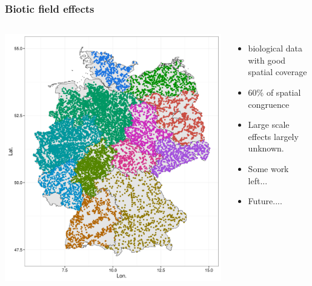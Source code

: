 \documentclass[
	12pt
	]{beamer}
\begin{document}
\begin{frame}
\frametitle{Biotic field effects}
	\begin{columns}
	    	    	\includegraphics[width=1.1\textwidth, keepaspectratio]{figs/mzb_map.png}
	    \begingroup
		\footnotesize %
	        \begin{itemize}
	        	\item biological data with good spatial coverage
	        	\item 60\% of spatial congruence 
	        	\item Large scale effects largely unknown.
	        	\item Some work left...
	        	\item Future....
	        \end{itemize}
	       \endgroup
	\end{columns}

\end{frame}
\end{document}
